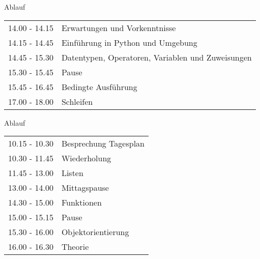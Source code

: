 \begin{frame}{Ablauf}
\begin{tabular}{ l l }
	14.00 - 14.15 & Erwartungen und Vorkenntnisse\\
	14.15 - 14.45 & Einführung in Python und Umgebung \\
	14.45 - 15.30 & Datentypen, Operatoren, Variablen und Zuweisungen\\
	15.30 - 15.45 & Pause \\
	15.45 - 16.45 & Bedingte Ausführung \\
	17.00 - 18.00 & Schleifen \\
	
\end{tabular}
\end{frame}

\begin{frame}{Ablauf}

\begin{tabular}{ l l }
	10.15 - 10.30 & Besprechung Tagesplan\\
	10.30 - 11.45 & Wiederholung \\
	11.45 - 13.00 & Listen \\
	13.00 - 14.00 & Mittagspause\\
	14.30 - 15.00 & Funktionen\\
	15.00 - 15.15 & Pause\\
	
	15.30 - 16.00 & Objektorientierung\\
	16.00 - 16.30 & Theorie\\

	
\end{tabular}
\end{frame}